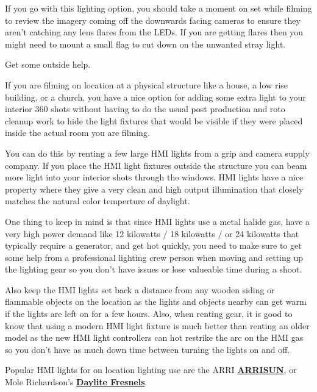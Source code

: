 \begin{fullwidth}
If you go with this lighting option, you should take a moment on set while filming to review the imagery coming off the downwards facing cameras to ensure they aren't catching any lens flares from the LEDs. If you are getting flares then you might need to mount a small flag to cut down on the unwanted stray light.

{\large Get some outside help. \par}

If you are filming on location at a physical structure like a house, a low rise building, or a church, you have a nice option for adding some extra light to your interior 360 shots without having to do the usual post production and roto cleanup work to hide the light fixtures that would be visible if they were placed inside the actual room you are filming. 

You can do this by renting a few large HMI lights from a grip and camera supply company. If you place the HMI light fixtures outside the structure you can beam more light into your interior shots through the windows. HMI lights have a nice property where they give a very clean and high output illumination that closely matches the natural color temperture of daylight.


One thing to keep in mind is that since HMI lights use a metal halide gas, have a very high power demand like 12 kilowatts / 18 kilowatts / or 24 kilowatts that typically require a generator, and get hot quickly, you need to make sure to get some help from a professional lighting crew person when moving and setting up the lighting gear so you don't have issues or lose valueable time during a shoot.

Also keep the HMI lights set back a distance from any wooden siding or flammable objects on the location as the lights and objects nearby can get warm if the lights are left on for a few hours. Also, when renting gear, it is good to know that using a modern HMI light fixture is much better than renting an older model as the new HMI light controllers can hot restrike the arc on the HMI gas so you don't have as much down time between turning the lights on and off.


Popular HMI lights for on location lighting use are the ARRI \textbf{\href{http://www.arri.com/lighting/lighting_equipment/lampheads/daylight_hmi_lampheads/}{ARRISUN}}, or Mole Richardson's \textbf{\href{http://mole.com/products/index/daylite-fesnels}{Daylite Fresnels}}.


\clearpage
\end{fullwidth}